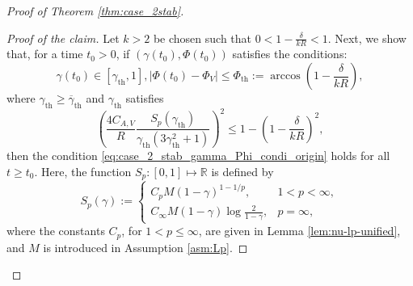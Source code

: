 \documentclass[10pt]{article}
\theoremstyle{definition}
\theoremstyle{definition}
\numberwithin{equation}{section}
\newcommand{\R}{\mathbb{R}}
\newcommand{\gammaTH}{\gamma_{\mathrm{th}}}
\newcommand{\PhiV}{\Phi_{V}}
\newcommand{\PhiTH}{\Phi_{\mathrm{th}}}
\newcommand{\BargammaTH}{\overline{\gamma}_{\mathrm{th}}}
\begin{document}
\begin{proof}[Proof of Theorem \ref{thm:case_2stab}]
\begin{proof}[Proof of the claim]
Let $k > 2$ be chosen such that $0 < 1 - \frac{\delta}{kR} < 1$. 
Next, we show that, for a time $t_0 > 0$, if $(\gamma(t_0), \Phi(t_0))$ satisfies the conditions:
\begin{subequations}\label{eq:case2_claim_condi}
\begin{equation}\label{eq:case2_claim_condi_1}
\gamma(t_0) \in [\gammaTH, 1],
\end{equation}
\begin{equation}\label{eq:case2_claim_condi_2}
\left| \Phi(t_0) - \PhiV \right| \leq \PhiTH := \arccos \left( 1 - \frac{\delta}{k R} \right),
\end{equation}
\end{subequations}
where $\gammaTH \geq \BargammaTH$ and $\gammaTH$ satisfies
\begin{equation}\label{eq:case2_claim_condi_3}
\left( \frac{4 C_{A,V}}{R} \frac{S_p(\gammaTH)}{\gammaTH (3\gammaTH^2 + 1)} \right)^2 \leq 1 - \left( 1 - \frac{\delta}{kR} \right)^2,
\end{equation}
then the condition \eqref{eq:case_2_stab_gamma_Phi_condi_origin} holds for all $t \geq t_0$.
Here, the function $S_p: [0,1] \mapsto \R$ is defined by
\begin{equation}\label{eq:Sp_gamma}
S_p (\gamma) := \left\{ \begin{array}{ll}
    C_p M (1 - \gamma)^{1 - 1/p}, & 1 < p < \infty, \\[5pt]
    C_{\infty} M (1-\gamma) \log \frac{2}{1 - \gamma}, & p = \infty,
\end{array} \right.
\end{equation}
where the constants $C_p$, for $1 < p \leq \infty$, are given in Lemma \ref{lem:nu-lp-unified}, and $M$ is introduced in Assumption \ref{asm:Lp}.


\end{proof}
\end{proof}
\end{document}
